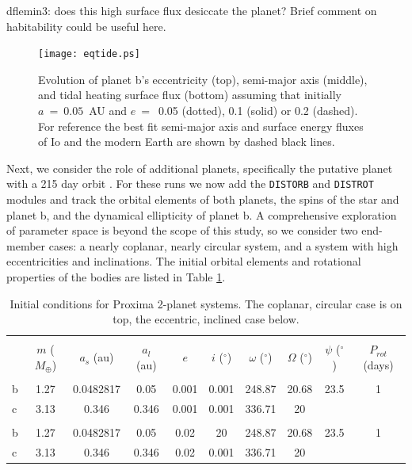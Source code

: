 \documentclass[preprint,12pt]{aastex}
\newcommand{\xxx}[1]{{\color{red} #1}} %
\def\distorb{\texttt{\footnotesize{DISTORB}}\xspace}
\def\distrot{\texttt{\footnotesize{DISTROT}}\xspace}
\begin{document}
\xxx{dflemin3: does this high surface flux desiccate the planet?  Brief comment on habitability could be useful here.}

\begin{figure} 
\begin{center}
\texttt{[image: eqtide.ps]}
\end{center}
\caption{Evolution of planet b's eccentricity (top), semi-major axis
  (middle), and tidal heating surface flux (bottom) assuming that
  initially $a~=~0.05$~AU and $e~=$~0.05 (dotted), 0.1 (solid) or 0.2
  (dashed). For reference the best fit semi-major axis and surface
  energy fluxes of Io and the modern Earth are shown by dashed black
  lines.}
\label{fig:eqtide}
\end{figure}

Next, we consider the role of additional planets, specifically the
putative planet with a 215 day orbit \citep{AngladaEscude16}. For
these runs we now add the \distorb and \distrot modules and track the
orbital elements of both planets, the spins of the star and planet b,
and the dynamical ellipticity of planet b. A comprehensive exploration
of parameter space is beyond the scope of this study, so we consider
two end-member cases: a nearly coplanar, nearly circular system, and a
system with high eccentricities and inclinations. The initial orbital
elements and rotational properties of the bodies are listed in Table \ref{tab:orbitic}.

\begin{table}[h]
\centering
\begin{tabular}{lccccccccc}
\hline\hline \\[-1.5ex]
& $m$ ($M_{\oplus}$)  & $a_s$ (au) & $a_l$ (au) & $e$ & $i$ ($^{\circ}$)
 & $\omega$ ($^{\circ}$) & $\Omega$ ($^{\circ}$) & $\psi$ ($^{\circ}$) & 
 $P_{rot}$ (days)\\[0.5ex]
\hline \\ [-1.5ex]
b & 1.27 & 0.0482817 & 0.05 & 0.001 & 0.001 & 248.87 & 20.68 & 23.5 & 1  \\
c & 3.13 & 0.346 & 0.346 & 0.001 & 0.001 & 336.71 & 20 & &  \\
\hline \\
b & 1.27 & 0.0482817 & 0.05 & 0.02 & 20 & 248.87 & 20.68 & 23.5 & 1  \\
c & 3.13 & 0.346 & 0.346 & 0.02 & 0.001 & 336.71 & 20 & &  \\
\end{tabular}
\caption{Initial conditions for Proxima 2-planet systems. The coplanar, 
  circular case is on top, the eccentric, inclined case below.}
\label{tab:orbitic}
\end{table}
\end{document}
